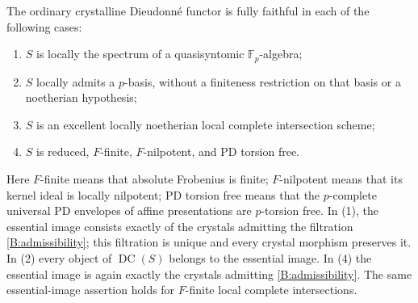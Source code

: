 \begin{theorem}
\label{B:positive-crystals}
The ordinary crystalline Dieudonn\'e functor is fully faithful in
each of the following cases:
\begin{enumerate}
 \item $S$ is locally the spectrum of a quasisyntomic
 $\mathbb F_p$-algebra;
 \item $S$ locally admits a $p$-basis, without a finiteness restriction
 on that basis or a noetherian hypothesis;
 \item $S$ is an excellent locally noetherian local complete
 intersection scheme;
 \item $S$ is reduced, $F$-finite, $F$-nilpotent, and PD torsion free.
\end{enumerate}
Here $F$-finite means that absolute Frobenius is finite;
$F$-nilpotent means that its kernel ideal is locally nilpotent;
PD torsion free means that the $p$-complete universal PD envelopes
of affine presentations are $p$-torsion free.
In (1), the essential image consists exactly of the crystals admitting
the filtration \eqref{B:admissibility}; this filtration is unique and
every crystal morphism preserves it. In (2) every object of
$\operatorname{DC}(S)$ belongs to the essential image.
In (4) the essential image is again exactly the crystals admitting
\eqref{B:admissibility}. The same essential-image assertion holds for
$F$-finite local complete intersections.
\end{theorem}

